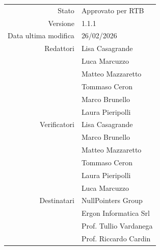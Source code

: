 \begin{center}
\begin{tabular}{r|l}
    Stato & Approvato per RTB \\[0.5em]
    Versione & 1.1.1 \\[0.5em]
    Data ultima modifica & 26/02/2026 \\[0.5em]
    Redattori & Lisa Casagrande \\
	          & Luca Marcuzzo \\
	          & Matteo Mazzaretto \\
	          & Tommaso Ceron \\
              & Marco Brunello \\
              & Laura Pieripolli \\[0.5em]
    Verificatori & Lisa Casagrande \\
                 & Marco Brunello \\
	             & Matteo Mazzaretto \\
	             & Tommaso Ceron \\
	             & Laura Pieripolli \\ 
                 & Luca Marcuzzo \\ [0.5em]
    Destinatari & NullPointers Group \\
                & Ergon Informatica Srl \\
                & Prof. Tullio Vardanega \\
                & Prof. Riccardo Cardin \\
    
\end{tabular}
\end{center}
